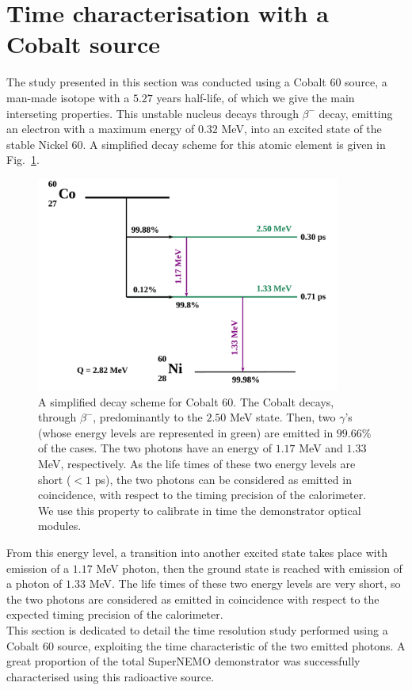 \section{Time characterisation with a Cobalt source}
\label{sec:CoSource}
The study presented in this section was conducted using a Cobalt $60$ source, a man-made isotope with a $5.27$ years half-life, of which we give the main interseting properties.
This unstable nucleus decays through $\beta^{-}$ decay, emitting an electron with a maximum energy of $0.32$ MeV, into an excited state of the stable Nickel $60$.
A simplified decay scheme for this atomic element is given in Fig.~\ref{fig:Co_decay_scheme}.
\begin{figure}[h]
  \centering
  \includegraphics[width=10cm]{commissioning/fig_commissioning/Co_decay_scheme.pdf}
  \caption{A simplified decay scheme for Cobalt $60$.
    The Cobalt decays, through $\beta^{-}$, predominantly to the $2.50$ MeV state.
    Then, two $\gamma$'s (whose energy levels are represented in green) are emitted in $99.66$\% of the cases.
    The two photons have an energy of $1.17$ MeV and $1.33$ MeV, respectively.
    As the life times of these two energy levels are short ($<1$ ps), the two photons can be considered as emitted in coincidence, with respect to the timing precision of the calorimeter.
    We use this property to calibrate in time the demonstrator optical modules.
    \label{fig:Co_decay_scheme}}
\end{figure}
From this energy level, a transition into another excited state takes place with emission of a $1.17$ MeV photon, then the ground state is reached with emission of a photon of $1.33$ MeV.
The life times of these two energy levels are very short, so the two photons are considered as emitted in coincidence with respect to the expected timing precision of the calorimeter.\\
\newline
This section is dedicated to detail the time resolution study performed using a Cobalt $60$ source, exploiting the time characteristic of the two emitted photons.
A great proportion of the total SuperNEMO demonstrator was successfully characterised using this radioactive source.


